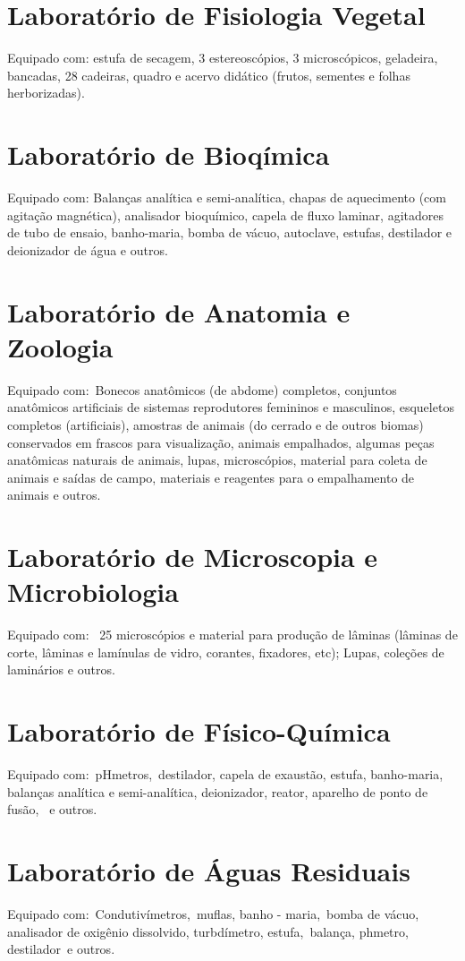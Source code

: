 \documentclass[11pt,fleqn]{book} %
\begin{document}
\section{Laboratório de Fisiologia Vegetal}
Equipado com: estufa de secagem, 3 estereoscópios, 3 microscópicos, geladeira, bancadas, 28 cadeiras, quadro e acervo didático (frutos, sementes e folhas herborizadas). 

\section{Laboratório de Bioqímica}
Equipado com: Balanças analítica e semi-analítica, chapas de aquecimento (com agitação magnética), analisador bioquímico, capela de fluxo laminar, agitadores de tubo de ensaio, banho-maria, bomba de vácuo, autoclave, estufas, destilador e deionizador de água e outros.

\section{Laboratório de Anatomia e Zoologia}
Equipado com: Bonecos anatômicos (de abdome) completos, conjuntos anatômicos artificiais de sistemas reprodutores femininos e masculinos, esqueletos completos (artificiais), amostras de animais (do cerrado e de outros biomas) conservados em frascos para visualização, animais empalhados, algumas peças anatômicas naturais de animais, lupas, microscópios, material para coleta de animais e saídas de campo, materiais e reagentes para o empalhamento de animais e outros.

\section{Laboratório de Microscopia e Microbiologia}
Equipado com:  25 microscópios e material para produção de lâminas (lâminas de corte, lâminas e lamínulas de vidro, corantes, fixadores, etc); Lupas, coleções de laminários e outros.

\section{Laboratório de Físico-Química}
Equipado com: pHmetros, destilador, capela de exaustão, estufa, banho-maria, balanças analítica e semi-analítica, deionizador, reator, aparelho de ponto de fusão,  e outros.

\section{Laboratório de Águas Residuais}
Equipado com: Condutivímetros, muflas, banho - maria, bomba de vácuo, analisador de oxigênio dissolvido, turbdímetro, estufa, balança, phmetro, destilador e outros.
\end{document}
